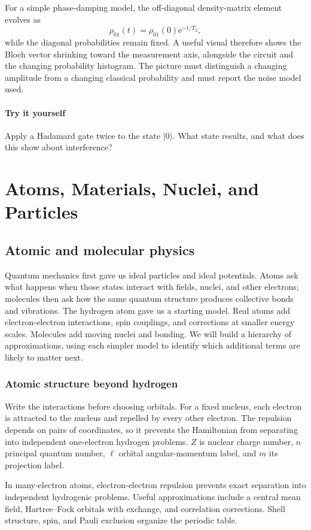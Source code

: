 \documentclass[11pt,oneside]{book}
\newcommand{\ee}{\mathrm{e}}
\newcommand{\ket}[1]{\lvert #1\rangle}
\theoremstyle{reviewstyle}
\newcommand{\learningcheck}[1]{\subsection*{Try it yourself}\noindent #1\par}
\begin{document}
For a simple phase-damping model, the off-diagonal density-matrix element evolves as
\begin{equation}
\rho_{01}(t)=\rho_{01}(0)\ee^{-t/T_2},
\end{equation}
while the diagonal probabilities remain fixed. A useful visual therefore shows the Bloch vector shrinking toward the measurement axis, alongside the circuit and the changing probability histogram. The picture must distinguish a changing amplitude from a changing classical probability and must report the noise model used.

\learningcheck{Apply a Hadamard gate twice to the state $\ket0$. What state results, and what does this show about interference?}

\part{Atoms, Materials, Nuclei, and Particles}
\chapter{Atomic and molecular physics}
Quantum mechanics first gave us ideal particles and ideal potentials. Atoms ask what happens when those states interact with fields, nuclei, and other electrons; molecules then ask how the same quantum structure produces collective bonds and vibrations.
The hydrogen atom gave us a starting model. Real atoms add electron-electron interactions, spin couplings, and corrections at smaller energy scales. Molecules add moving nuclei and bonding. We will build a hierarchy of approximations, using each simpler model to identify which additional terms are likely to matter next.

\section{Atomic structure beyond hydrogen}
Write the interactions before choosing orbitals. For a fixed nucleus, each electron is attracted to the nucleus and repelled by every other electron. The repulsion depends on pairs of coordinates, so it prevents the Hamiltonian from separating into independent one-electron hydrogen problems. $Z$ is nuclear charge number, $n$ principal quantum number, $\ell$ orbital angular-momentum label, and $m$ its projection label.

In many-electron atoms, electron-electron repulsion prevents exact separation into independent hydrogenic problems. Useful approximations include a central mean field, Hartree--Fock orbitals with exchange, and correlation corrections. Shell structure, spin, and Pauli exclusion organize the periodic table.
\end{document}
